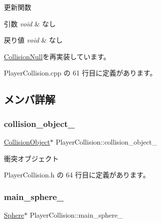更新関数 


\begin{DoxyParams}{引数}
{\em void} & なし \\
\hline
\end{DoxyParams}

\begin{DoxyRetVals}{戻り値}
{\em void} & なし \\
\hline
\end{DoxyRetVals}


\mbox{\hyperlink{class_collision_null_ad6ac0e9b06fcb4e3d19a5c3c1cadfe7e}{Collision\+Null}}を再実装しています。



 Player\+Collision.\+cpp の 61 行目に定義があります。



\subsection{メンバ詳解}
\mbox{\label{class_player_collision_a6e07c4eb15b2b02e167b7f52a6cc1ec4}} 
\subsubsection{\texorpdfstring{collision\+\_\+object\+\_\+}{collision\_object\_}}
{\footnotesize\ttfamily \mbox{\hyperlink{class_collision_object}{Collision\+Object}}$\ast$ Player\+Collision\+::collision\+\_\+object\+\_\+\hspace{0.3cm}{\ttfamily [private]}}



衝突オブジェクト 



 Player\+Collision.\+h の 64 行目に定義があります。

\mbox{\label{class_player_collision_a8165ba4a5bbe16afff43ca5b47e7218c}} 
\subsubsection{\texorpdfstring{main\+\_\+sphere\+\_\+}{main\_sphere\_}}
{\footnotesize\ttfamily \mbox{\hyperlink{class_sphere}{Sphere}}$\ast$ Player\+Collision\+::main\+\_\+sphere\+\_\+\hspace{0.3cm}{\ttfamily [private]}}



